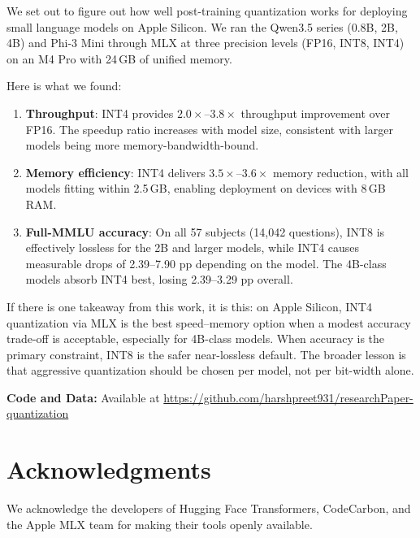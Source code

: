\documentclass[11pt,a4paper]{article}
\begin{document}
We set out to figure out how well post-training quantization works for deploying small language models on Apple Silicon. We ran the Qwen3.5 series (0.8B, 2B, 4B) and Phi-3 Mini through MLX at three precision levels (FP16, INT8, INT4) on an M4 Pro with 24\,GB of unified memory.

Here is what we found:

\begin{enumerate}[leftmargin=*,nosep]
    \item \textbf{Throughput}: INT4 provides $2.0\times$--$3.8\times$ throughput improvement over FP16. The speedup ratio increases with model size, consistent with larger models being more memory-bandwidth-bound.

    \item \textbf{Memory efficiency}: INT4 delivers $3.5\times$--$3.6\times$ memory reduction, with all models fitting within 2.5\,GB, enabling deployment on devices with 8\,GB RAM.

    \item \textbf{Full-MMLU accuracy}: On all 57 subjects (14,042 questions), INT8 is effectively lossless for the 2B and larger models, while INT4 causes measurable drops of 2.39--7.90 pp depending on the model. The 4B-class models absorb INT4 best, losing 2.39--3.29 pp overall.
\end{enumerate}

If there is one takeaway from this work, it is this: on Apple Silicon, INT4 quantization via MLX is the best speed--memory option when a modest accuracy trade-off is acceptable, especially for 4B-class models. When accuracy is the primary constraint, INT8 is the safer near-lossless default. The broader lesson is that aggressive quantization should be chosen per model, not per bit-width alone.

\begin{sloppypar}
\noindent\textbf{Code and Data:} Available at \url{https://github.com/harshpreet931/researchPaper-quantization}
\end{sloppypar}

\section*{Acknowledgments}

We acknowledge the developers of Hugging Face Transformers, CodeCarbon, and the Apple MLX team for making their tools openly available.


\end{document}

